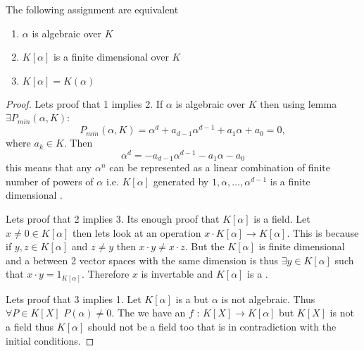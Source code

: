\begin{proposition}
  The following assignment are equivalent
  \begin{enumerate}
  \item $\alpha$ is algebraic over $K$
  \item $K\left[\alpha\right]$ is a finite dimensional
     over $K$
  \item $K\left[\alpha\right] = K\left(\alpha\right)$ 
  \end{enumerate}
  \begin{proof}
    Lets proof that 1 implies 2. If $\alpha$ is algebraic over $K$
    then using lemma  $\exists
    P_{min}\left(\alpha, K\right)$:
    \[
    P_{min}\left(\alpha, K\right) = \alpha^d + a_{d-1}\alpha^{d-1} +
    a_1 \alpha + a_0 = 0,
    \]
    where $a_k \in K$. Then
    \[
    \alpha^d  = - a_{d-1}\alpha^{d-1} -
    a_1 \alpha - a_0
    \]
    this means that any $\alpha^n$ can be represented as a linear
    combination of finite number of powers of $\alpha$ i.e.
    $K\left[\alpha\right]$ generated by $1, \alpha, \dots,
    \alpha^{d-1}$ is a finite dimensional .

    Lets proof that 2 implies 3. Its enough proof that
    $K\left[\alpha\right]$ is a field. Let $x \ne 0 \in
    K\left[\alpha\right]$ then lets look at an operation
    $x \cdot K\left[\alpha\right] \rightarrow
    K\left[\alpha\right]$. This is  because if
    $y, z \in K\left[\alpha\right]$ and $z \ne y$ then $x \cdot y \ne x
    \cdot z$. But the $K\left[\alpha\right]$ is finite dimensional
     and a  between
    2 vector spaces with the same dimension is
     thus $\exists y \in K\left[\alpha\right]$
    such that $x \cdot y = 1_{K\left[\alpha\right]}$. Therefore $x$ is
    invertable and $K\left[\alpha\right]$ is a
    .

    Lets proof that 3 implies 1. Let $K\left[\alpha\right]$ is a
     but $\alpha$ is not algebraic. Thus $\forall P
    \in K\left[X\right]$ $P(\alpha) \ne 0$. The we have an
      $f$ :
    $K\left[X\right] \to K\left[\alpha\right]$ but $K\left[X\right]$
    is not a field thus $K\left[\alpha\right]$ should not be a field
    too that is in contradiction with the initial conditions.
  \end{proof}
  \label{prop:lec1_1}
\end{proposition}

